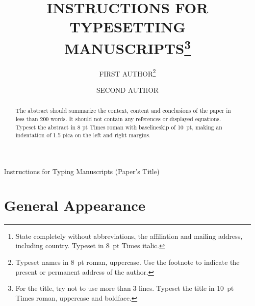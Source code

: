 \documentclass{ws-ijmpd}
\begin{document}
{Instructions for Typing Manuscripts (Paper's Title)}

%
\catchline{}{}{}{}{}
%

\title{INSTRUCTIONS FOR TYPESETTING
MANUSCRIPTS\footnote{For the title, try not to use more than 3 lines.
Typeset the title in 10~pt Times roman, uppercase and boldface.}  }

\author{FIRST AUTHOR\footnote{Typeset names in
8~pt roman, uppercase. Use the footnote to indicate the
present or permanent address of the author.}}

\address{University Department, University Name, Address\\
City, State ZIP/Zone,
Country\footnote{State completely without abbreviations, the
affiliation and mailing address, including country. Typeset in
8~pt Times italic.}\\
first\_author@university.edu}

\author{SECOND AUTHOR}

\address{Group, Laboratory, Address\\
City, State ZIP/Zone, Country\\
second\_author@group.com}

\maketitle

\begin{history}
\end{history}

\begin{abstract}
The abstract should summarize the context, content
and conclusions of the paper in less than 200 words. It should
not contain any references or displayed equations. Typeset the
abstract in 8 pt Times roman with baselineskip of 10~pt, making
an indentation of 1.5 pica on the left and right margins.
\end{abstract}




\section{General Appearance}	
\end{document}
